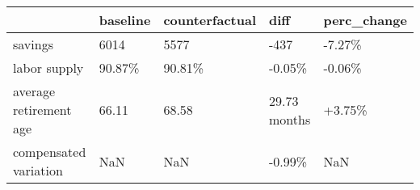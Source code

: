 \begin{tabular}{lllll}
\toprule
 & baseline & counterfactual & diff & perc_change \\
\midrule
savings & 6014 & 5577 & -437 & -7.27\% \\
labor supply & 90.87\% & 90.81\% & -0.05\% & -0.06\% \\
average retirement age & 66.11 & 68.58 & 29.73 months & +3.75\% \\
compensated variation & NaN & NaN & -0.99\% & NaN \\
\bottomrule
\end{tabular}
